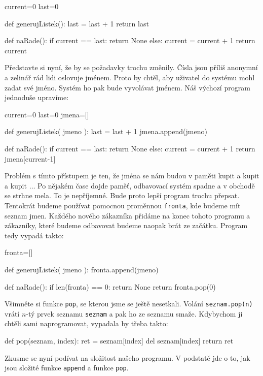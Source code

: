 \begin{python}
current=0
last=0

def generujListek():
    last = last + 1
    return last
    
def naRade():
    if current == last:
        return None
    else:
        current = current + 1
    return current
\end{python}

Představte si nyní, že by se požadavky trochu změnily. Čísla jsou příliš anonymní a zelinář rád lidi oslovuje jménem. Proto by chtěl,
aby uživatel do systému mohl zadat své jméno. Systém ho pak bude vyvolávat jménem. Náš výchozí program jednoduše upravíme:

\begin{python}
current=0
last=0
jmena=[]

def generujListek( jmeno ):
    last = last + 1
    jmena.append(jmeno)
    
def naRade():
    if current == last:
        return None
    else:
        current = current + 1
    return jmena[current-1]
\end{python}

Problém s tímto přístupem je ten, že jména se nám budou v paměti kupit a kupit a kupit $\ldots$ Po nějakém čase dojde paměť, odbavovací systém spadne a 
v obchodě se strhne mela. To je nepříjemné. Bude proto lepší program trochu přepsat. Tentokrát budeme používat pomocnou proměnnou {\tt fronta}, kde
budeme mít seznam jmen. Každého nového zákazníka přidáme na konec tohoto programu a zákazníky, které budeme odbavovat budeme naopak brát ze začátku.
Program tedy vypadá takto:

\begin{python}
fronta=[]

def generujListek( jmeno ):
    fronta.append(jmeno)
    
def naRade():
    if len(fronta) == 0:
        return None
    return fronta.pop(0)
\end{python}

Všimněte si funkce {\tt pop}, se kterou jsme se ještě nesetkali. Volání {\tt seznam.pop(n)} vrátí $n$-tý prvek seznamu {\tt seznam}
a pak ho ze seznamu smaže. Kdybychom ji chtěli sami naprogramovat, vypadala by třeba takto:

\begin{python}
def pop(seznam, index):
    ret = seznam[index]
    del seznam[index]
    return ret
\end{python}

Zkusme se nyní podívat na složitost našeho programu. V podstatě jde o to, jak jsou složité funkce {\tt append} a funkce {\tt pop}.

